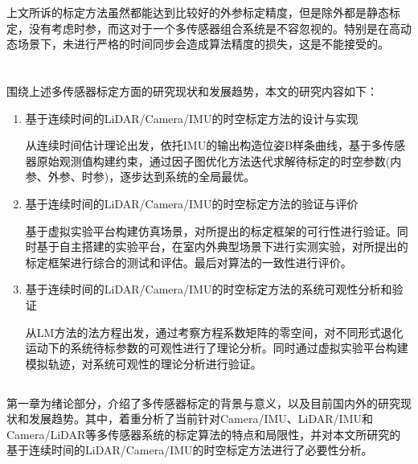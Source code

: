 上文所诉的标定方法虽然都能达到比较好的外参标定精度，但是除\cite{park2020spatiotemporal}外都是静态标定，没有考虑时参，而这对于一个多传感器组合系统是不容忽视的。特别是在高动态场景下，未进行严格的时间同步会造成算法精度的损失，这是不能接受的。

\section{}

\subsection{}
围绕上述多传感器标定方面的研究现状和发展趋势，本文的研究内容如下：
\begin{enumerate}
    \item 基于连续时间的LiDAR/Camera/IMU的时空标定方法的设计与实现
    
    从连续时间估计理论出发，依托IMU的输出构造位姿B样条曲线，基于多传感器原始观测值构建约束，通过因子图优化方法迭代求解待标定的时空参数(内参、外参、时参)，逐步达到系统的全局最优。

    \item 基于连续时间的LiDAR/Camera/IMU的时空标定方法的验证与评价
    
    基于虚拟实验平台构建仿真场景，对所提出的标定框架的可行性进行验证。同时基于自主搭建的实验平台，在室内外典型场景下进行实测实验，对所提出的标定框架进行综合的测试和评估。最后对算法的一致性进行评价。
    
    \item 基于连续时间的LiDAR/Camera/IMU的时空标定方法的系统可观性分析和验证
    
    从LM方法的法方程出发，通过考察方程系数矩阵的零空间，对不同形式退化运动下的系统待标参数的可观性进行了理论分析。同时通过虚拟实验平台构建模拟轨迹，对系统可观性的理论分析进行验证。
    
\end{enumerate}

\subsection{}

第一章为绪论部分，介绍了多传感器标定的背景与意义，以及目前国内外的研究现状和发展趋势。其中，着重分析了当前针对Camera/IMU、LiDAR/IMU和Camera/LiDAR等多传感器系统的标定算法的特点和局限性，并对本文所研究的基于连续时间的LiDAR/Camera/IMU的时空标定方法进行了必要性分析。

